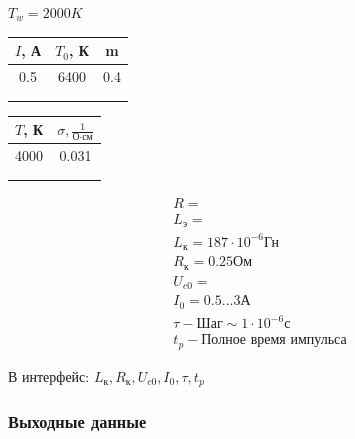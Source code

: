 \begin{table}[H]
    $T_w = 2000K$

    \centering
    \begin{tabular}{c|c|c}
        $I$, А & $T_0$, К & m \\
        \hline
        0.5 & 6400 & 0.4 \\
            & & \\
            & & \\
    \end{tabular}
\end{table}

\begin{table}[H]
    \centering
    \begin{tabular}{c|c}
        $T$, К & $\sigma, \frac{1}{\text{О} \cdot \text{см}}$ \\
        \hline
        4000 & 0.031 \\
             & \\
             & \\
    \end{tabular}
\end{table}

\begin{equation*}
    \begin{matrix}
        R = \\
        L_\text{э} = \\
        L_\text{к} = 187 \cdot 10^{-6} \text{Гн} \\
        R_\text{к} = 0.25 \text{Ом} \\
        U_{c0} = \\
        I_0 = 0.5 ... 3 \text{А} \\
        \tau - \text{Шаг} \sim 1 \cdot 10^{-6} \text{с} \\
        t_p - \text{Полное время импульса}
    \end{matrix}
\end{equation*}

В интерфейс: $L_\text{к}, R_\text{к}, U_{c0}, I_0, \tau, t_p$

\subsubsection{Выходные данные}

